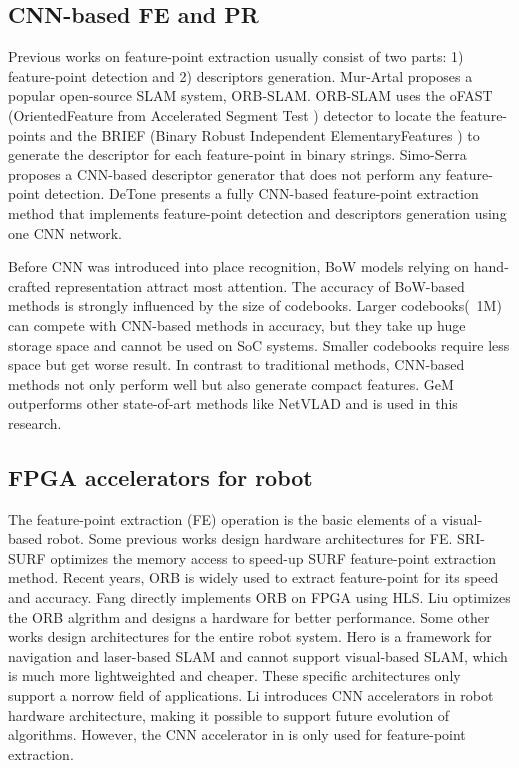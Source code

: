 \label{sec:relate}
\subsection{ CNN-based FE and PR }

Previous works on feature-point extraction usually consist of two parts: 1) feature-point detection and 2) descriptors generation.
Mur-Artal \cite{Mur-Artal:2017281} proposes a popular open-source SLAM system, ORB-SLAM. ORB-SLAM uses the oFAST (OrientedFeature from Accelerated Segment Test \cite{biadgie2014feature}) detector to locate the feature-points and the BRIEF (Binary Robust Independent ElementaryFeatures \cite{calonder2010brief}) to generate the descriptor for each feature-point in binary strings. 
Simo-Serra \cite{simo2015discriminative} proposes a CNN-based descriptor generator that does not perform any feature-point detection. 
DeTone \cite{detone2018superpoint} presents a fully CNN-based feature-point extraction method that implements feature-point detection and descriptors generation using one CNN network.

Before CNN was introduced into place recognition, BoW \cite{small_1} models relying on hand-crafted representation attract most attention. The accuracy of BoW-based methods is strongly influenced by the size of codebooks. Larger codebooks(~1M) \cite{large_1, large_2} can compete with CNN-based methods in accuracy, but they take up huge storage space and cannot be used on SoC systems. Smaller codebooks\cite{small_1, small_2} require less space but get worse result. In contrast to traditional methods, CNN-based methods not only perform well but also generate compact features. GeM \cite{radenovic2018fine} outperforms other state-of-art methods like NetVLAD \cite{arandjelovic2016netvlad} and is used in this research.

\subsection{ FPGA accelerators for robot }

The feature-point extraction (FE) operation is the basic elements of a visual-based robot.
Some previous works design hardware architectures for FE.
SRI-SURF \cite{jia2016sri} optimizes the memory access to speed-up SURF \cite{bay2006surf} feature-point extraction method. Recent years, ORB is widely used to extract feature-point for its speed and accuracy. 
Fang \cite{fang2017fpga} directly implements ORB on FPGA using HLS. Liu \cite{liu2019eslam} optimizes the ORB algrithm and designs a hardware for better performance.
Some other works design architectures for the entire robot system. Hero \cite{shi2018hero} is a framework for navigation and laser-based SLAM and cannot support visual-based SLAM, which is much more lightweighted and cheaper. These specific architectures only support a norrow field of applications. 
Li \cite{li2019879gops} introduces CNN accelerators in robot hardware architecture, making it possible to support future evolution of algorithms. However, the CNN accelerator in \cite{li2019879gops} is only used for feature-point extraction.

